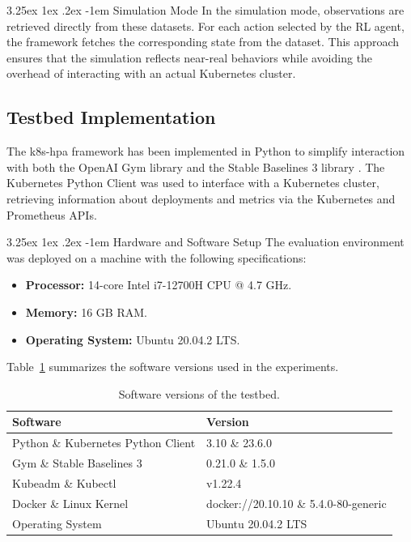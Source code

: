 \documentclass[conference]{IEEEtran}
\makeatletter
\renewcommand\paragraph{\@startsection{paragraph}{5}{\z@}%
  {3.25ex \@plus1ex \@minus.2ex}%
  {-1em}%
  {\normalfont\normalsize\bfseries}}
\makeatother
\begin{document}
\paragraph{Simulation Mode}
In the simulation mode, observations are retrieved directly from these datasets. For each action selected by the RL agent, the framework fetches the corresponding state from the dataset. This approach ensures that the simulation reflects near-real behaviors while avoiding the overhead of interacting with an actual Kubernetes cluster.

\subsection{Testbed Implementation}

The k8s-hpa framework has been implemented in Python to simplify interaction with both the OpenAI Gym library and the Stable Baselines 3 library \cite{raffin2019stable}. The Kubernetes Python Client was used to interface with a Kubernetes cluster, retrieving information about deployments and metrics via the Kubernetes and Prometheus APIs.

\paragraph{Hardware and Software Setup}
The evaluation environment was deployed on a machine with the following specifications:
\begin{itemize}
    \item \textbf{Processor:} 14-core Intel i7-12700H CPU @ 4.7 GHz.
    \item \textbf{Memory:} 16 GB RAM.
    \item \textbf{Operating System:} Ubuntu 20.04.2 LTS.
\end{itemize}

Table~\ref{tab:testbed-software} summarizes the software versions used in the experiments.

\begin{table}[h]
    \centering
    \caption{Software versions of the testbed.}
    \label{tab:testbed-software}
    \begin{tabular}{|l|l|}
        \hline
        \textbf{Software} & \textbf{Version} \\
        \hline
        Python \& Kubernetes Python Client & 3.10 \& 23.6.0 \\
        Gym \& Stable Baselines 3 & 0.21.0 \& 1.5.0 \\
        Kubeadm \& Kubectl & v1.22.4 \\
        Docker \& Linux Kernel & docker://20.10.10 \& 5.4.0-80-generic \\
        Operating System & Ubuntu 20.04.2 LTS \\
        \hline
    \end{tabular}
\end{table}
\end{document}
